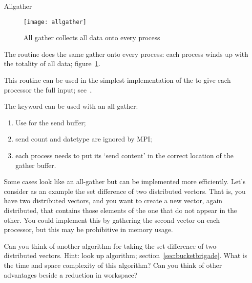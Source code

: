  {Allgather}

\begin{figure}[ht]
  \texttt{[image: allgather]}
  \caption{All gather collects all data onto every process}
  \label{fig:allgather}
\end{figure}

The  routine does the same gather onto
every process: each process winds up with the totality of all data;
figure~\ref{fig:allgather}.

This routine can be used in the simplest implementation of the 
%
 to give each processor the
full input; see~.

The  keyword can be used with an all-gather:
\begin{enumerate}
\item Use  for the send buffer;
\item send count and datetype are ignored by MPI;
\item each process needs to put its `send content' in the correct
  location of the gather buffer.
\end{enumerate}

Some cases look like an all-gather but can be implemented more efficiently.
Let's consider as an example the set difference of two distributed vectors.
That is, you have two distributed vectors, and you want to
create a new vector, again distributed,
that contains those elements of the one that do not appear in the other.
You could implement this by gathering the
second vector on each processor, but this may be prohibitive in memory
usage.

\begin{exercise}
  Can you think of another algorithm for taking the set difference of
  two distributed vectors. Hint: look up  algorithm;
  section~\ref{sec:bucketbrigade}.
  What is the time and space complexity
  of this algorithm? Can you think of other advantages beside a
  reduction in workspace?
\end{exercise}
